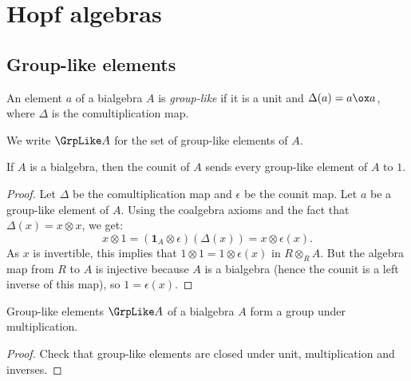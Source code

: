 \section{Hopf algebras}


\subsection{Group-like elements}


\begin{definition}
  \label{0-grp-like}
  \uses{}
  \leanok

  An element $a$ of a bialgebra $A$ is \emph{group-like} if it is a unit and $\Delta(a) = a \ox a$,
  where $\Delta$ is the comultiplication map.

  We write $\GrpLike A$ for the set of group-like elements of $A$.
\end{definition}


\begin{lemma}
  \label{0-grp-like-counit}
  \leanok

  If $A$ is a bialgebra, then the counit of $A$ sends every group-like element of
  $A$ to $1$.
\end{lemma}
\begin{proof}
  \uses{}
  \leanok

  Let $\Delta$ be the comultiplication map and $\epsilon$ be the counit map.
  Let $a$ be a group-like element of $A$.
  Using the coalgebra axioms and the fact that $\Delta(x) = x\otimes x$, we get:
  \[x \otimes 1 = (\mathbf{1}_A\otimes\epsilon)(\Delta(x))= x \otimes\epsilon(x).\]
  As $x$ is invertible, this implies that $1\otimes 1 = 1\otimes\epsilon(x)$ in
  $R\otimes_R A$. But the algebra map from $R$ to $A$ is injective because $A$
  is a bialgebra (hence the counit is a left inverse of this map), so $1=\epsilon(x)$.
\end{proof}


\begin{proposition}
  \label{0-grp-like-grp}
  \leanok

  Group-like elements $\GrpLike A$ of a bialgebra $A$ form a group under multiplication.
\end{proposition}
\begin{proof}
  \uses{}
  \leanok

  Check that group-like elements are closed under unit, multiplication and inverses.
\end{proof}


